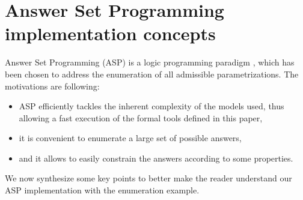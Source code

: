 \section{Answer Set Programming implementation concepts}\label{sec:impl}


\newcommand{\ti}[1]{\texttt{\textit{#1}}}
\newcommand{\aspil}[1]{\texttt{#1}}
\newcommand{\asp}[1]{\begin{itemize} \item[] \aspil{#1} \end{itemize}}

\newcommand{\atom}[1]{#1}
\newcommand{\predicate}[1]{#1}
\newcommand{\la}{\leftarrow}
\newcommand{\var}[1]{#1}
\newcommand{\nota}{\neg}

\newcommand{\paramlabel}{\predicate{param\_label}}
\newcommand{\paramres}{\predicate{param\_resource}}
\newcommand{\component}{\predicate{component}}
\newcommand{\componentlevels}{\predicate{component\_levels}}
\newcommand{\param}{\predicate{param}}
\newcommand{\inferedparam}{\predicate{infered\_param}}
\newcommand{\lessactive}{\predicate{less\_active}}
\newcommand{\paraminf}{\predicate{param\_inf}}



Answer Set Programming (ASP) is a logic programming paradigm \cite{Baral03},
which has been chosen to address the enumeration of all admissible parametrizations.
The motivations are following:
\begin{itemize}
  \item ASP efficiently tackles the inherent complexity of the models used, thus allowing a fast execution of the formal tools defined in this paper,
  \item it is convenient to enumerate a large set of possible answers,
  \item and it allows to easily constrain the answers according to some properties.
\end{itemize}
We now synthesize some key points to better make the reader understand our ASP implementation with the enumeration example.

